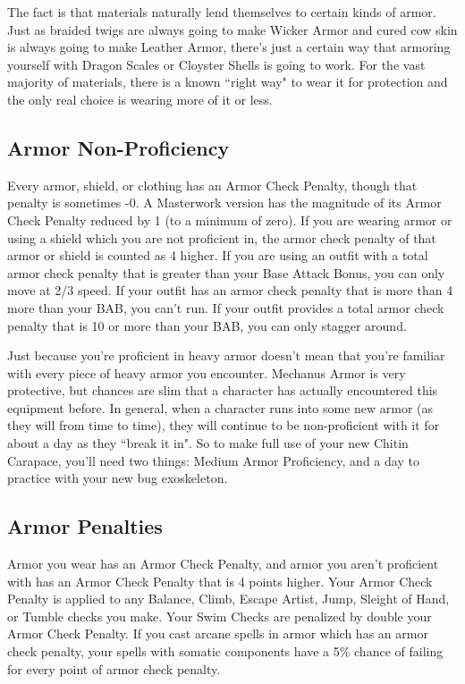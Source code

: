 The fact is that materials naturally lend themselves to certain kinds of armor. Just as braided twigs are always going to make Wicker Armor and cured cow skin is always going to make Leather Armor, there's just a certain way that armoring yourself with Dragon Scales or Cloyster Shells is going to work. For the vast majority of materials, there is a known ``right way" to wear it for protection and the only real choice is wearing more of it or less.

\subsection{Armor Non-Proficiency}

Every armor, shield, or clothing has an Armor Check Penalty, though that penalty is sometimes -0. A Masterwork version has the magnitude of its Armor Check Penalty reduced by 1 (to a minimum of zero). If you are wearing armor or using a shield which you are not proficient in, the armor check penalty of that armor or shield is counted as 4 higher. If you are using an outfit with a total armor check penalty that is greater than your Base Attack Bonus, you can only move at 2/3 speed. If your outfit has an armor check penalty that is more than 4 more than your BAB, you can't run. If your outfit provides a total armor check penalty that is 10 or more than your BAB, you can only stagger around.

Just because you're proficient in heavy armor doesn't mean that you're familiar with every piece of heavy armor you encounter. Mechanus Armor is very protective, but chances are slim that a character has actually encountered this equipment before. In general, when a character runs into some new armor (as they will from time to time), they will continue to be non-proficient with it for about a day as they ``break it in". So to make full use of your new Chitin Carapace, you'll need two things: Medium Armor Proficiency, and a day to practice with your new bug exoskeleton.

\subsection{Armor Penalties}

Armor you wear has an Armor Check Penalty, and armor you aren't proficient with has an Armor Check Penalty that is 4 points higher. Your Armor Check Penalty is applied to any Balance, Climb, Escape Artist, Jump, Sleight of Hand, or Tumble checks you make. Your Swim Checks are penalized by double your Armor Check Penalty. If you cast arcane spells in armor which has an armor check penalty, your spells with somatic components have a 5\% chance of failing for every point of armor check penalty.


